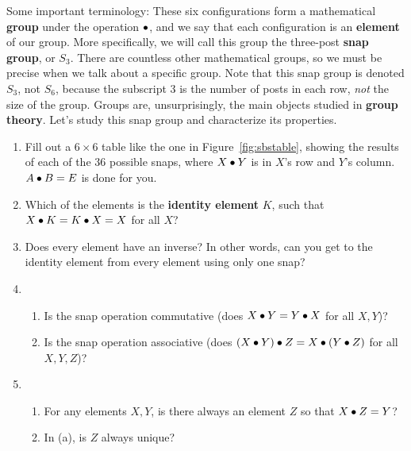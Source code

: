 \documentclass[../textbook.tex]{subfiles}
\begin{document}
Some important terminology: These six configurations form a mathematical \textbf{group} under the operation $\bullet$, and we say that each configuration is an \textbf{element} of our group.
More specifically, we will call this group the three-post \textbf{snap group}, or $S_3$. There are countless other mathematical groups, so we must be precise when we talk about a specific group. Note that this snap group is denoted $S_3$, not $S_6$, because the subscript $3$ is the number of posts in each row, \textit{not} the size of the group.
Groups are, unsurprisingly, the main objects studied in \textbf{group theory}.
Let's study this snap group and characterize its properties.

\begin{enumerate}
\item Fill out a $6\times 6$ table like the one in Figure~\ref{fig:sbstable}, showing the results of each of the $36$ possible snaps, where $X\bullet Y$ is in $X$'s row and $Y$'s column. $A\bullet B=E$ is done for you.
\item Which of the elements is the \textbf{identity element} $K$, such that $X\bullet K = K\bullet X = X$ for all $X$? \label{prob:group_definition_start}
\item Does every element have an inverse? In other words, can you get to the identity element from every element using only one snap?
\item \begin{enumerate}
\item Is the snap operation commutative (does $X \bullet Y = Y \bullet X$ for all $X,Y$)?
\item Is the snap operation associative (does $(X \bullet Y) \bullet Z = X \bullet (Y\bullet Z)$ for all $X,Y,Z$)?
\end{enumerate}
\item \begin{enumerate}
\item For any elements $X, Y$, is there always an element $Z$ so that $X\bullet Z=Y$?
\item In (a), is $Z$ always unique?
\end{enumerate}
\setcounter{some_name}{\value{enumi}}
\end{enumerate}%
\end{document}
